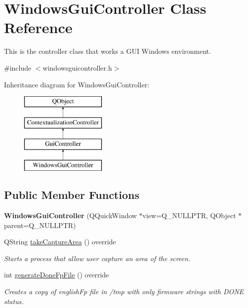 \hypertarget{classWindowsGuiController}{}\section{Windows\+Gui\+Controller Class Reference}
\label{classWindowsGuiController}


This is the controller class that works a G\+UI Windows environment.  




{\ttfamily \#include $<$windowsguicontroller.\+h$>$}

Inheritance diagram for Windows\+Gui\+Controller\+:\begin{figure}[H]
\begin{center}
\leavevmode
\includegraphics[height=4.000000cm]{classWindowsGuiController}
\end{center}
\end{figure}
\subsection*{Public Member Functions}
\begin{DoxyCompactItemize}
\item 
\mbox{\label{classWindowsGuiController_ac6bbeedbefdf126c07e4b8a9b0f82d10}} 
{\bfseries Windows\+Gui\+Controller} (Q\+Quick\+Window $\ast$view=Q\+\_\+\+N\+U\+L\+L\+P\+TR, Q\+Object $\ast$parent=Q\+\_\+\+N\+U\+L\+L\+P\+TR)
\item 
Q\+String \mbox{\hyperlink{classWindowsGuiController_afcda369c002842873b3fb3cc3a593c06}{take\+Capture\+Area}} () override
\begin{DoxyCompactList}\small\item\em Starts a process that allow user capture an area of the screen. \end{DoxyCompactList}\item 
int \mbox{\hyperlink{classWindowsGuiController_aa78e32ce3635fc99f846d545d4a320b3}{generate\+Done\+Fp\+File}} () override
\begin{DoxyCompactList}\small\item\em Creates a copy of english\+Fp file in /tmp with only firmware strings with D\+O\+NE status. \end{DoxyCompactList}\end{DoxyCompactItemize}
